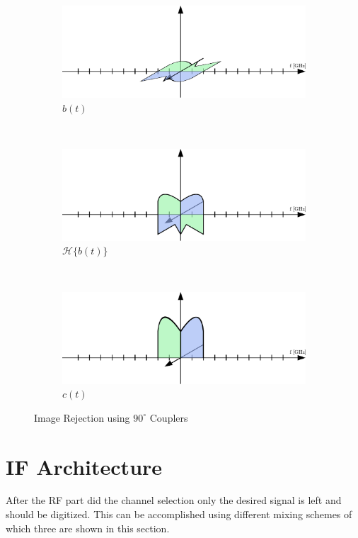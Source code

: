 \begin{figure}[h!]
\begin{subfigure}{0.45\textwidth}
    \includegraphics[width=\textwidth]{figures/rx_rf_1_freq_b}
    \caption{$b(t)$}
    \label{fig:rx_rf_1_freq_b}
  \end{subfigure}
  \vspace{4ex} \\
  \begin{subfigure}{0.45\textwidth}
    \centering
    \includegraphics[width=\textwidth]{figures/rx_rf_1_freq_Hb}
    \caption{$\mathcal{H}\{b(t)\}$}
    \label{fig:rx_rf_1_freq_Hb}
  \end{subfigure}
  ~
  \begin{subfigure}{0.45\textwidth}
    \centering
    \includegraphics[width=\textwidth]{figures/rx_rf_1_freq_c}
    \caption{$c(t)$}
    \label{fig:rx_rf_1_freq_c}
  \end{subfigure}
  \caption{Image Rejection using $90^\circ$ Couplers}
  \label{fig:rx_rf_1_freq}
\end{figure}

\section{IF Architecture}
After the \gls{RF} part did the channel selection only the desired signal
is left and should be digitized.
This can be accomplished using different
mixing schemes of which three are shown in this section. \\

